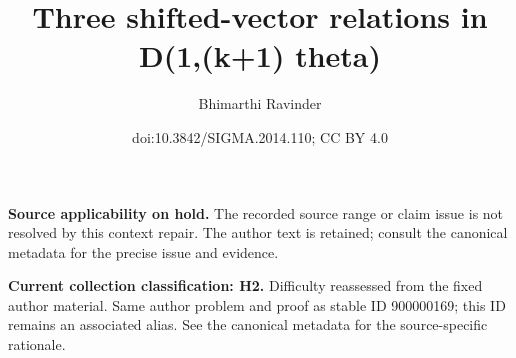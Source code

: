 \documentclass[10pt,a4paper]{amsart}
\title{Three shifted-vector relations in D(1,(k+1) theta)}
\author{Bhimarthi Ravinder}
\date{doi:10.3842/SIGMA.2014.110; CC BY 4.0}
\begin{document}
\maketitle
\par\medskip\noindent\textbf{Source applicability on hold.} The recorded source range or claim issue is not resolved by this context repair. The author text is retained; consult the canonical metadata for the precise issue and evidence.\par\medskip

\par\medskip\noindent\textbf{Current collection classification: H2.} Difficulty reassessed from the fixed author material. Same author problem and proof as stable ID 900000169; this ID remains an associated alias. See the canonical metadata for the source-specific rationale.\par\medskip
\end{document}

